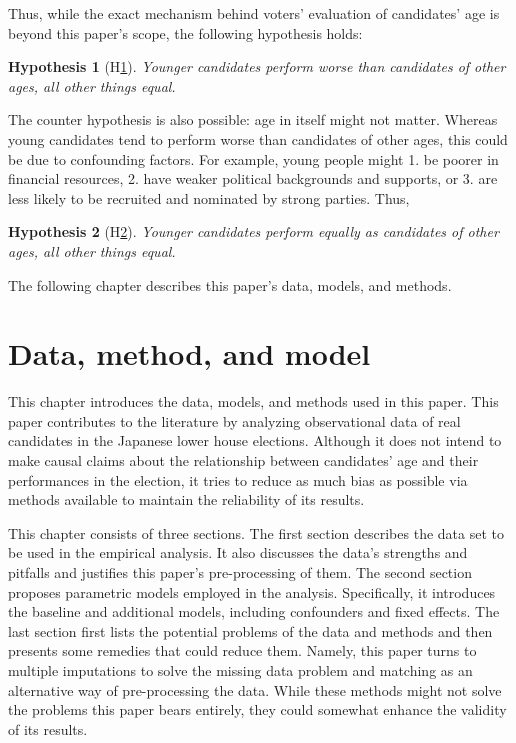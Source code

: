\documentclass[a4paper, 12pt]{article}\usepackage[dvipdfmx]{graphicx}\usepackage[]{xcolor}
\newtheorem{hyp}{Hypothesis}
\begin{document}
Thus, while the exact mechanism behind voters' evaluation of candidates' age is beyond this paper's scope, the following hypothesis holds: 

\begin{hyp}[H\ref{hyp:first}] \label{hyp:first}
Younger candidates perform worse than candidates of other ages, all other things equal.
\end{hyp}

The counter hypothesis is also possible: age in itself might not matter. Whereas young candidates tend to perform worse than candidates of other ages, this could be due to confounding factors. For example, young people might 1. be poorer in financial resources, 2. have weaker political backgrounds and supports, or 3. are less likely to be recruited and nominated by strong parties. Thus, 

\begin{hyp}[H\ref{hyp:second}] \label{hyp:second}
Younger candidates perform equally as candidates of other ages, all other things equal.
\end{hyp}

The following chapter describes this paper's data, models, and methods. 

\section{Data, method, and model} \label{ch4}

This chapter introduces the data, models, and methods used in this paper. This paper contributes to the literature by analyzing observational data of real candidates in the Japanese lower house elections. Although it does not intend to make causal claims about the relationship between candidates' age and their performances in the election, it tries to reduce as much bias as possible via methods available to maintain the reliability of its results. 

This chapter consists of three sections. The first section describes the data set to be used in the empirical analysis. It also discusses the data's strengths and pitfalls and justifies this paper's pre-processing of them. The second section proposes parametric models employed in the analysis. Specifically, it introduces the baseline and additional models, including confounders and fixed effects. The last section first lists the potential problems of the data and methods and then presents some remedies that could reduce them. Namely, this paper turns to multiple imputations to solve the missing data problem and matching as an alternative way of pre-processing the data. While these methods might not solve the problems this paper bears entirely, they could somewhat enhance the validity of its results. 
\end{document}
